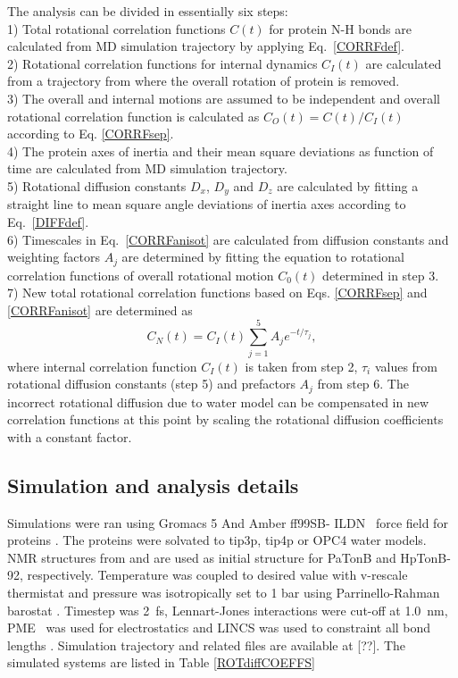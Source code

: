 \documentclass[pre,aps,floatfix,authordate1-4,twocolumn]{revtex4-1}
\begin{document}
The analysis can be divided in essentially six steps: \\
1) Total rotational correlation functions $C(t)$
for protein N-H bonds are calculated from MD simulation trajectory
by applying Eq.~\ref{CORRFdef}. \\
2) Rotational correlation functions for internal
dynamics $C_I(t)$ are calculated from a trajectory from where the overall
rotation of protein is removed. \\
3) The overall and internal motions are assumed to be independent and overall
rotational correlation function is calculated as $C_O(t)=C(t)/C_I(t)$ according to Eq. \ref{CORRFsep}. \\
4) The protein axes of inertia and their mean square deviations as function of
time are calculated from MD simulation trajectory. \\
5) Rotational diffusion constants $D_x$, $D_y$ and $D_z$ are calculated by fitting a straight line
to mean square angle deviations of inertia axes according to Eq.~\ref{DIFFdef}. \\
6) Timescales in Eq.~\ref{CORRFanisot} are calculated from diffusion constants and
weighting factors $A_j$ are determined by fitting the equation to
rotational correlation functions of overall rotational motion $C_0(t)$ determined in step 3. \\
7) New total rotational correlation functions based on Eqs. \ref{CORRFsep} and \ref{CORRFanisot}
are determined as
\begin{equation}\label{newCORRF}
  C_N(t)=C_I(t)\sum_{j=1}^5 A_j e^{-t/\tau_j},
\end{equation}
where internal correlation function $C_I(t)$ is taken from step 2,
$\tau_i$ values from rotational diffusion constants (step 5) and
prefactors $A_j$ from step 6. The incorrect rotational
diffusion due to water model can be compensated in new correlation
functions at this point
 by scaling the rotational diffusion coefficients with a constant factor.



\subsection{Simulation and analysis details}
Simulations were ran using Gromacs 5 \cite{abraham15} And Amber ff99SB- ILDN~\cite{lindorff10}
force field for proteins . The proteins were solvated
to tip3p\cite{jorgensen83}, tip4p \cite{jorgensen83} or OPC4 \cite{izadi14} water models.
NMR structures from \cite{??} and \cite{ciragan16} are used as initial structure for 
PaTonB and HpTonB-92, respectively.
Temperature was coupled to desired value with v-rescale thermistat \cite{bussi07} and pressure was 
isotropically set to 1 bar using Parrinello-Rahman barostat \cite{parrinello81}.
Timestep was 2~fs, Lennart-Jones interactions were cut-off at 1.0~nm,
PME~\cite{darden93,essman95} was used for electrostatics and LINCS was used
to constraint all bond lengths \cite{hess07}. Simulation trajectory and related
files are available at [??].
The simulated systems are listed
in Table \ref{ROTdiffCOEFFS}
\end{document}
